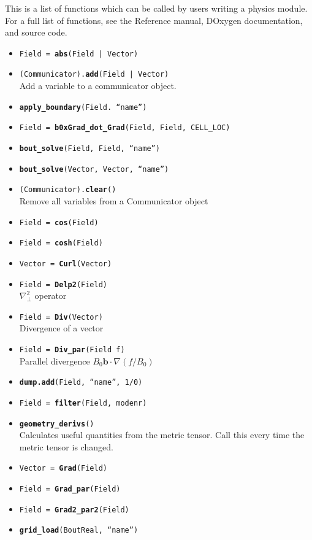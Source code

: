 \documentclass[12pt]{article}
\begin{document}
This is a list of functions which can be called by users writing
a physics module. For a full list of functions, see the Reference manual,
DOxygen documentation, and source code.

\begin{itemize}
  \item \texttt{Field = {\bf abs}(Field | Vector)}
  \item \texttt{(Communicator).{\bf{add}}(Field | Vector)} \\
    Add a variable to a communicator object.
  \item \texttt{{\bf apply\_boundary}(Field. ``name'')}
  \item \texttt{Field = {\bf b0xGrad\_dot\_Grad}(Field, Field, CELL\_LOC)}
  \item \texttt{{\bf bout\_solve}(Field, Field, ``name'')}
  \item \texttt{{\bf bout\_solve}(Vector, Vector, ``name'')}
  \item \texttt{(Communicator).{\bf{clear}}()} \\
    Remove all variables from a Communicator object
  \item \texttt{Field = {\bf cos}(Field)}
  \item \texttt{Field = {\bf cosh}(Field)}
  \item \texttt{Vector = {\bf Curl}(Vector)}
  \item \texttt{Field = {\bf Delp2}(Field)} \\
    $\nabla_\perp^2$ operator
  \item \texttt{Field = {\bf Div}(Vector)} \\
    Divergence of a vector
  \item \texttt{Field = {\bf Div\_par}(Field f)} \\
    Parallel divergence $B_0\mathbf{b}\cdot\nabla\left(f / B_0\right)$
  \item \texttt{{\bf dump.add}(Field, ``name'', 1/0)}
  \item \texttt{Field = {\bf filter}(Field, modenr)}
  \item \texttt{{\bf geometry\_derivs}()} \\
    Calculates useful quantities from the metric tensor. Call this
    every time the metric tensor is changed.
  \item \texttt{Vector = {\bf Grad}(Field)}
  \item \texttt{Field = {\bf Grad\_par}(Field)}
  \item \texttt{Field = {\bf Grad2\_par2}(Field)}
  \item \texttt{{\bf grid\_load}(BoutReal, ``name'')} \\

\end{itemize}
\end{document}
